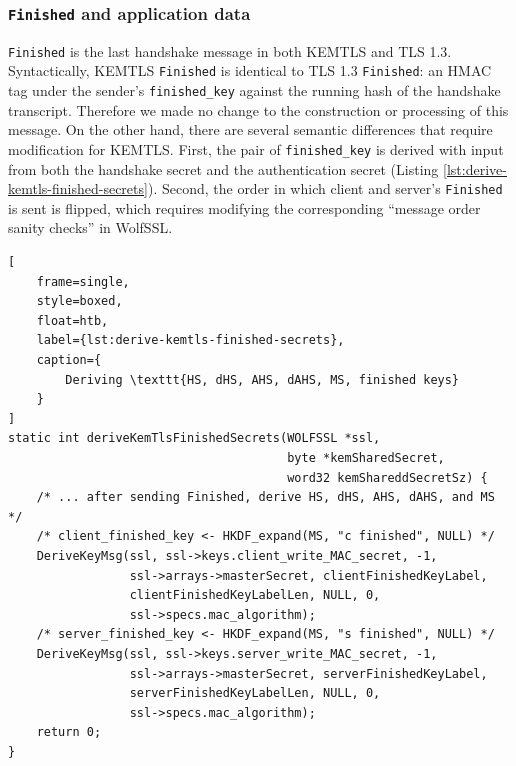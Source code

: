 \documentclass[letterpaper,12pt,titlepage,oneside,final]{book}
\begin{document}
\subsubsection{\texttt{Finished} and application data}
\texttt{Finished} is the last handshake message in both KEMTLS and TLS 1.3.
Syntactically, KEMTLS \texttt{Finished} is identical to TLS 1.3 \texttt{Finished}: an HMAC tag under the sender's \texttt{finished\_key} against the running hash of the handshake transcript.
Therefore we made no change to the construction or processing of this message.
On the other hand, there are several semantic differences that require modification for KEMTLS.
First, the pair of \texttt{finished\_key} is derived with input from both the handshake secret and the authentication secret (Listing \ref{lst:derive-kemtls-finished-secrets}). Second, the order in which client and server's \texttt{Finished} is sent is flipped, which requires modifying the corresponding ``message order sanity checks'' in WolfSSL.

\begin{lstlisting}[
    frame=single, 
    style=boxed, 
    float=htb,
    label={lst:derive-kemtls-finished-secrets}, 
    caption={
        Deriving \texttt{HS, dHS, AHS, dAHS, MS, finished keys}
    }
]
static int deriveKemTlsFinishedSecrets(WOLFSSL *ssl, 
                                       byte *kemSharedSecret,
                                       word32 kemShareddSecretSz) {
    /* ... after sending Finished, derive HS, dHS, AHS, dAHS, and MS */
    /* client_finished_key <- HKDF_expand(MS, "c finished", NULL) */
    DeriveKeyMsg(ssl, ssl->keys.client_write_MAC_secret, -1,
                 ssl->arrays->masterSecret, clientFinishedKeyLabel,
                 clientFinishedKeyLabelLen, NULL, 0,
                 ssl->specs.mac_algorithm);
    /* server_finished_key <- HKDF_expand(MS, "s finished", NULL) */
    DeriveKeyMsg(ssl, ssl->keys.server_write_MAC_secret, -1,
                 ssl->arrays->masterSecret, serverFinishedKeyLabel,
                 serverFinishedKeyLabelLen, NULL, 0,
                 ssl->specs.mac_algorithm);
    return 0;
}
\end{lstlisting}
\end{document}
